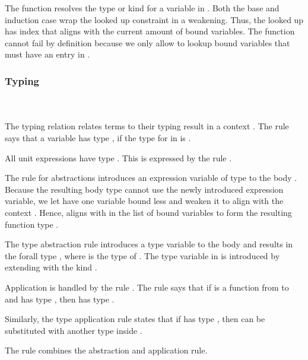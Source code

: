 \noindent The  function resolves the type or kind for a variable  in .
\Flookup
Both the base and induction case wrap the looked up constraint in a weakening. Thus, the looked up  has index  that aligns with the current amount of bound variables. The  function cannot fail by definition because we only allow to lookup bound variables that must have an entry in .

\subsubsection{Typing}\hfill\\\\
The typing relation    \Data{:}  relates terms  to their typing result  in a context .
\FTyping
The rule  says that a variable   has type , if the type for  in  is . 

\noindent All unit expressions  have type . This is expressed by the rule .

\noindent The rule for abstractions  introduces an expression variable of type  to the body . 
Because the resulting body type  cannot use the newly introduced expression variable, we let  have one variable bound less and weaken it to align with the context   . 
Hence,  aligns with  in the list of bound variables to form the resulting function type   . 

\noindent The type abstraction rule  introduces a type variable to the body  and results in the forall type  , where  is the type of . The type variable in  is introduced by extending  with the kind . 

\noindent Application is handled by the rule . The rule says that if  is a function from  to  and  has type , then    has type . 

\noindent Similarly, the type application rule  states that if  has type  , then  can be substituted with another type  inside . 

\noindent The rule  combines the abstraction and application rule.

